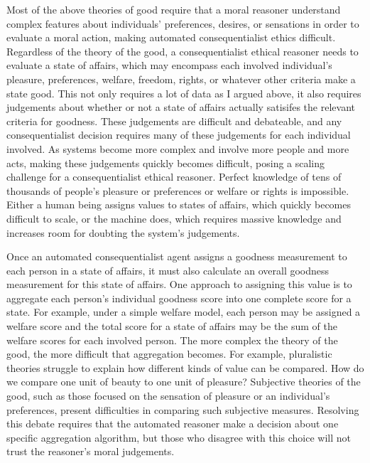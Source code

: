 \begin{isabellebody}
\begin{isamarkuptext}
Most of the above theories of good require that a moral reasoner understand complex features about
individuals' preferences, desires, or sensations in order to evaluate a moral action, making automated
consequentialist ethics difficult. Regardless of the theory of the good, a consequentialist ethical 
reasoner needs to evaluate a state of affairs, which may encompass each involved individual's pleasure, 
preferences, welfare, freedom, rights, or whatever other criteria make a state good. This not only requires
a lot of data as I argued above, it also requires judgements about whether or not a state of affairs 
actually satisifes the relevant criteria for goodness. These judgements are difficult and debateable, 
and any consequentialist decision requires many of these judgements for each individual involved. As 
systems become more complex and involve more people and more acts, making these judgements quickly becomes
difficult, posing a scaling challenge for a consequentialist ethical reasoner. Perfect knowledge of 
tens of thousands of people's pleasure or preferences or welfare or rights is impossible. Either a human being 
assigns values to states of affairs, which quickly becomes difficult to scale, or the machine does, 
which requires massive knowledge and increases room for doubting the system's judgements.

Once an automated consequentialist agent assigns a goodness measurement to each person in a state of affairs, it 
must also calculate an overall goodness measurement for this state of affairs. One approach to assigning
this value is to aggregate each person's individual goodness score into one complete score for a state. 
For example, under a simple welfare model, each person may be assigned a welfare score and the total 
score for a state of affairs may be the sum of the welfare scores for each involved person.
The more complex the theory of the good, the more difficult that aggregation becomes. For example, 
pluralistic theories struggle to explain how different kinds of value can be compared. How do we compare
one unit of beauty to one unit of pleasure? Subjective theories of the good, such as those focused on 
the sensation of pleasure or an individual's preferences, present difficulties in comparing such 
subjective measures. Resolving this debate requires that the automated reasoner make a decision about
one specific aggregation algorithm, but those who disagree with this choice will not trust the reasoner's
moral judgements. 


\end{isamarkuptext}
\end{isabellebody}
